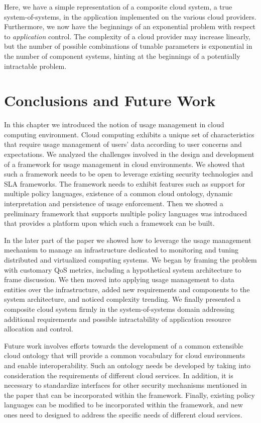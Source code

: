 \documentclass[notitlepage]{book}
\begin{document}
\begin{doublespace}
Here, we have a simple representation of a composite cloud system, a true system-of-systems, in the application implemented on the various cloud providers.  Furthermore, we now have the beginnings of an exponential problem with respect to \textit{application} control.  The complexity of a cloud provider may increase linearly, but the number of possible combinations of tunable parameters is exponential in the number of component systems, hinting at the beginnings of a potentially intractable problem.

\section{Conclusions and Future Work}\label{sec:conclusions}
In this chapter we introduced the notion of usage management in cloud computing environment. Cloud computing exhibits a unique set of characteristics that require usage management of users' data according to user concerns and expectations. We analyzed the challenges involved in the design and development of a framework for usage management in cloud environments. We showed that such a framework needs to be open to leverage existing security technologies and SLA frameworks. The framework needs to exhibit features such as support for multiple policy languages, existence of a common cloud ontology, dynamic interpretation and persistence of usage enforcement. Then we showed a preliminary framework that supports multiple policy languages was introduced that provides a platform upon which such a framework can be built. 

In the later part of the paper we showed how to leverage the usage management mechanism to  manage an infrastructure dedicated to monitoring and tuning distributed and virtualized computing systems. We began by framing the problem with customary QoS metrics, including a hypothetical system architecture to frame discussion. We then moved into applying usage management to data entities over the infrastructure, added new requirements and components to the system
architecture, and noticed complexity trending. We finally presented a composite cloud system firmly in the system-of-systems domain addressing additional requirements and possible intractability of application resource allocation and control.

Future work involves efforts towards the development of a common extensible cloud ontology that will provide a common vocabulary for cloud environments and enable interoperability. Such an ontology needs be developed by taking into consideration the requirements of different cloud services. In addition, it is necessary to standardize interfaces for other security mechanisms mentioned in the paper that can be incorporated within the framework. Finally, existing policy languages can be modified to be incorporated within the framework, and new ones need to designed to address the specific needs of different cloud services. 




\end{doublespace}
\end{document}
